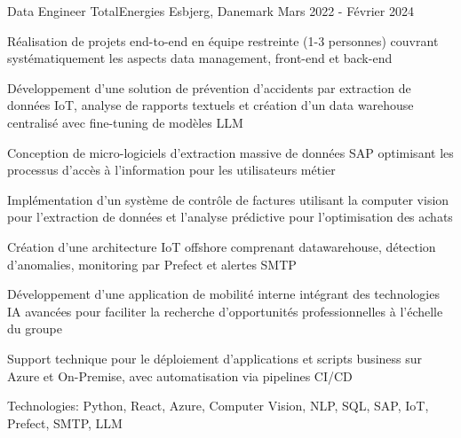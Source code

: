 \begin{cventries}
\cventry
{Data Engineer} %
{TotalEnergies} %
{Esbjerg, Danemark} %
{Mars 2022 - Février 2024} %
{ %
\begin{cvitems}
\item {Réalisation de projets end-to-end en équipe restreinte (1-3 personnes) couvrant systématiquement les aspects data management, front-end et back-end}
\item {Développement d'une solution de prévention d'accidents par extraction de données IoT, analyse de rapports textuels et création d'un data warehouse centralisé avec fine-tuning de modèles LLM}
\item {Conception de micro-logiciels d'extraction massive de données SAP optimisant les processus d'accès à l'information pour les utilisateurs métier}
\item {Implémentation d'un système de contrôle de factures utilisant la computer vision pour l'extraction de données et l'analyse prédictive pour l'optimisation des achats}
\item {Création d'une architecture IoT offshore comprenant datawarehouse, détection d'anomalies, monitoring par Prefect et alertes SMTP}
\item {Développement d'une application de mobilité interne intégrant des technologies IA avancées pour faciliter la recherche d'opportunités professionnelles à l'échelle du groupe}
\item {Support technique pour le déploiement d'applications et scripts business sur Azure et On-Premise, avec automatisation via pipelines CI/CD}
\item {Technologies: Python, React, Azure, Computer Vision, NLP, SQL, SAP, IoT, Prefect, SMTP, LLM}
\end{cvitems}
}
\vspace{1.5em}



\end{cventries}
